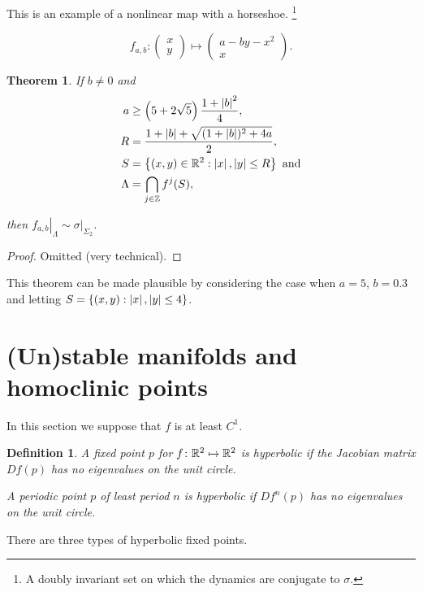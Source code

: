 \documentclass{notes}
\theoremstyle{plain}
\newtheorem{theorem}[proposition]{Theorem}
\newtheorem{definition}[proposition]{Definition}
\begin{document}
This is an example of a nonlinear map with a horseshoe.%
\footnote{A doubly invariant set on which the dynamics are
conjugate to $\sigma$.}

\[
f_{a,b} \colon \begin{pmatrix} x \\ y \end{pmatrix} \mapsto
\begin{pmatrix}
a - b y - x^2 \\
x
\end{pmatrix}.
\]

\begin{theorem}
If $b \neq 0$ and
\begin{align*}
a &\ge \left( 5 + 2 \sqrt{5} \right) \frac{ 1 + \left|b\right|^2}{4},\\
R &= \frac{1 + \left|b\right| + \sqrt{(1+\left|b\right|)^2 + 4 a}}{2}, \\
S &= \left\{ (x,y) \in \mathbb{R}^2 : \left|x\right|, \left|y\right| \le R \right\} \text{ and} \\
\Lambda &= \bigcap_{j \in \mathbb{Z}} f^j(S),
\end{align*}

then $\left.f_{a,b}\right|_\Lambda \sim \left. \sigma \right|_{\Sigma_2}$.
\end{theorem}

\begin{proof} Omitted (very technical).
\end{proof}

This theorem can be made plausible by considering the case when
$a=5$, $b=0.3$ and letting $S = \{ (x,y) : \left|x\right|, \left|y\right| \le 4\}$.

\vspace{2in}

\section{(Un)stable manifolds and homoclinic points}

In this section we suppose that $f$ is at least $C^1$.

\begin{definition}
  A fixed point $p$ for $f \colon \mathbb{R}^2 \mapsto \mathbb{R}^2$ is
  \emph{hyperbolic} if the Jacobian matrix $Df(p)$ has no eigenvalues
  on the unit circle.

  A periodic point $p$ of least period $n$ is hyperbolic if $Df^n(p)$
  has no eigenvalues on the unit circle.
\end{definition}

There are three types of hyperbolic fixed points.
\end{document}
